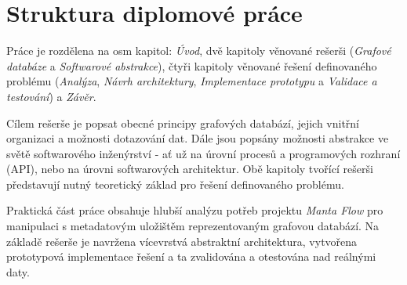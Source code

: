 \section{Struktura diplomové práce}
Práce je rozdělena na osm kapitol: \textit{Úvod}, dvě kapitoly věnované rešerši (\textit{Grafové databáze} a \textit{Softwarové abstrakce}), čtyři kapitoly věnované řešení definovaného problému (\textit{Analýza}, \textit{Návrh architektury}, \textit{Implementace prototypu} a \textit{Validace a testování}) a \textit{Závěr}.

Cílem rešerše je popsat obecné principy grafových databází, jejich vnitřní organizaci a možnosti dotazování dat. Dále jsou popsány možnosti abstrakce ve světě softwarového inženýrství - ať už na úrovní procesů a programových rozhraní (API), nebo na úrovni softwarových architektur. Obě kapitoly tvořící rešerši představují nutný teoretický základ pro řešení definovaného problému.

Praktická část práce obsahuje hlubší analýzu potřeb projektu \textit{Manta Flow} pro manipulaci s metadatovým uložištěm reprezentovaným grafovou databází. Na základě rešerše je navržena vícevrstvá abstraktní architektura, vytvořena prototypová implementace řešení a ta zvalidována a otestována nad reálnými daty.
